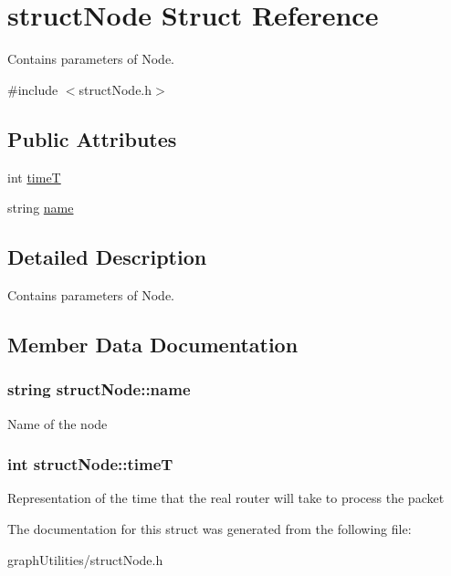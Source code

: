 \hypertarget{structstructNode}{\section{struct\-Node Struct Reference}
\label{structstructNode}
}


Contains parameters of Node.  




{\ttfamily \#include $<$struct\-Node.\-h$>$}

\subsection*{Public Attributes}
\begin{DoxyCompactItemize}
\item 
int \hyperlink{structstructNode_a4450e0a9d3d6df71d7164ebbdc7bd048}{time\-T}
\item 
string \hyperlink{structstructNode_a93a471b53af6dd948154d0d23e987863}{name}
\end{DoxyCompactItemize}


\subsection{Detailed Description}
Contains parameters of Node. 

\subsection{Member Data Documentation}
\hypertarget{structstructNode_a93a471b53af6dd948154d0d23e987863}{
\subsubsection[{name}]{\setlength{\rightskip}{0pt plus 5cm}string struct\-Node\-::name}}\label{structstructNode_a93a471b53af6dd948154d0d23e987863}
Name of the node \hypertarget{structstructNode_a4450e0a9d3d6df71d7164ebbdc7bd048}{
\subsubsection[{time\-T}]{\setlength{\rightskip}{0pt plus 5cm}int struct\-Node\-::time\-T}}\label{structstructNode_a4450e0a9d3d6df71d7164ebbdc7bd048}
Representation of the time that the real router will take to process the packet 

The documentation for this struct was generated from the following file\-:\begin{DoxyCompactItemize}
\item 
graph\-Utilities/struct\-Node.\-h\end{DoxyCompactItemize}
